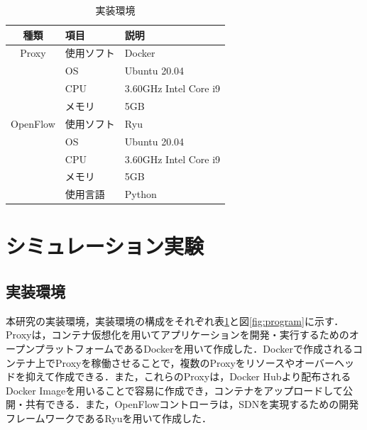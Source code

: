 \documentclass[Japanese]{dicomopapers}
\begin{document}
\begin{table}[!tb]
	\caption{実装環境}
	\label{tab:program}
	\centering
	\begin{tabular}{c|l|l}
		\hline
		種類     & 項目       & 説明                  \\
		\hline \hline
		Proxy    & 使用ソフト & Docker                \\
		         & OS         & Ubuntu 20.04          \\
		         & CPU        & 3.60GHz Intel Core i9 \\
		         & メモリ     & 5GB                   \\
		\hline
		OpenFlow & 使用ソフト & Ryu                   \\
		         & OS         & Ubuntu 20.04          \\
		         & CPU        & 3.60GHz Intel Core i9 \\
		         & メモリ     & 5GB                   \\
		         & 使用言語   & Python                \\
		\hline
	\end{tabular}
\end{table}

\section{シミュレーション実験}
\subsection{実装環境}
本研究の実装環境，実装環境の構成をそれぞれ表\ref{tab:program}と図\ref{fig:program}に示す．Proxyは，コンテナ仮想化を用いてアプリケーションを開発・実行するためのオープンプラットフォームであるDockerを用いて作成した．Dockerで作成されるコンテナ上でProxyを稼働させることで，複数のProxyをリソースやオーバーヘッドを抑えて作成できる．また，これらのProxyは，Docker Hubより配布されるDocker Imageを用いることで容易に作成でき，コンテナをアップロードして公開・共有できる．また，OpenFlowコントローラは，SDNを実現するための開発フレームワークであるRyuを用いて作成した．
\end{document}

